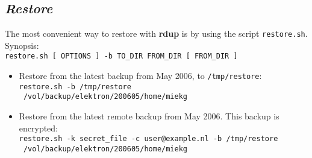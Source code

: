 \documentclass[a4paper, openany]{blocksbook}
\newcommand{\rdup}{\textbf{rdup}}
\newcommand{\cmd}[1]{\texttt{#1}}
\newcommand{\path}[1]{\texttt{#1}}
\begin{document}
\subsection*{\textit{Restore}}
The most convenient way to restore with \rdup{} is by using
the script \cmd{restore.sh}. Synopsis:\\
\cmd{restore.sh [ OPTIONS ] -b TO\_DIR FROM\_DIR [ FROM\_DIR ]}
\begin{itemize}
\item
Restore from the latest backup from May 2006, to \path{/tmp/restore}:\\
\cmd{restore.sh -b /tmp/restore \\\
/vol/backup/elektron/200605/home/miekg}
\item
Restore from the latest remote backup from May 2006. This backup
is encrypted:\\
\cmd{restore.sh -k secret\_file -c user@example.nl -b /tmp/restore \\\
/vol/backup/elektron/200605/home/miekg}
\end{itemize}
\end{document}
